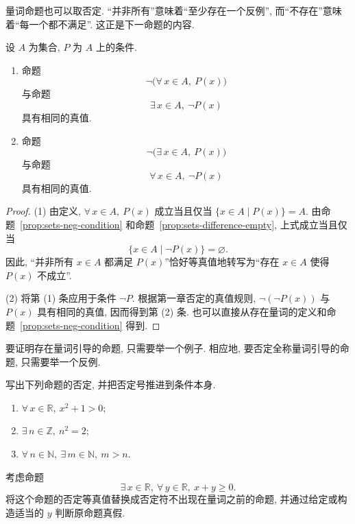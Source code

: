 \documentclass[usesamecnt, thmcnt=section, lang=cn, newtx, 10pt, scheme=chinese]{elegantbook}
\begin{document}
量词命题也可以取否定. ``并非所有''意味着``至少存在一个反例'', 而``不存在''意味着``每一个都不满足''. 这正是下一命题的内容.

\begin{proposition}\label{prop:sets-neg-quantifiers}
设 $A$ 为集合, $P $ 为 $A$ 上的条件.
\begin{enumerate}[label=\rm(\arabic*)]
  \item 命题
  \[
   \neg\bigl(\forall\,x\in A,\ P(x)\bigr)
  \]
  与命题
  \[
   \exists\,x\in A,\ \neg P(x)
  \]
  具有相同的真值.
  \item 命题
  \[
   \neg\bigl(\exists\,x\in A,\ P(x)\bigr)
  \]
  与命题
  \[
   \forall\,x\in A,\ \neg P(x)
  \]
  具有相同的真值.
\end{enumerate}
\end{proposition}

\begin{proof}
(1) 由定义, $\forall\,x\in A,\ P(x)$ 成立当且仅当 $\{x\in A\mid P(x)\}=A$. 由命题~\ref{prop:sets-neg-condition} 和命题~\ref{prop:sets-difference-empty}, 上式成立当且仅当
\[
 \{x\in A\mid\neg P(x)\}=\varnothing.
\]
因此, ``并非所有 $x\in A$ 都满足 $P(x)$''恰好等真值地转写为``存在 $x\in A$ 使得 $P(x)$ 不成立''.

(2) 将第 (1) 条应用于条件 $\neg P $. 根据第一章否定的真值规则, $\neg(\neg P(x))$ 与 $P(x)$ 具有相同的真值, 因而得到第 (2) 条. 也可以直接从存在量词的定义和命题~\ref{prop:sets-neg-condition} 得到.
\end{proof}

\begin{knowledge}
要证明存在量词引导的命题, 只需要举一个例子. 相应地, 要否定全称量词引导的命题, 只需要举一个反例.
\end{knowledge}

\begin{exercise}\label{ex:sets-quantifier-neg-01}
写出下列命题的否定, 并把否定号推进到条件本身.
\begin{enumerate}[label=\rm(\arabic*)]
  \item $\forall\,x\in\mathbb R,\ x^2+1>0$;
  \item $\exists\,n\in\mathbb Z,\ n^2=2$;
  \item $\forall\,n\in\mathbb N,\ \exists\,m\in\mathbb N,\ m>n$.
\end{enumerate}
\end{exercise}

\begin{exercise}\label{ex:sets-quantifier-neg-02}
考虑命题
\[
 \exists\,x\in\mathbb R,\ \forall\,y\in\mathbb R,\ x+y\geq0.
\]
将这个命题的否定等真值替换成否定符不出现在量词之前的命题, 并通过给定或构造适当的 $y$ 判断原命题真假.
\end{exercise}
\end{document}
